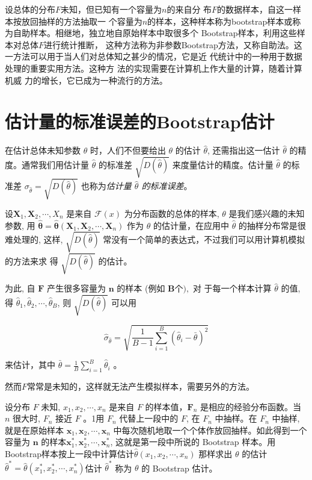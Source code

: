 设总体的分布$F$未知，但已知有一个容量为$n$的来自分
布$F$的数据样本，自这一样本按放回抽样的方法抽取一
个容量为$n$的样本，这种样本称为bootstrap样本或称
为自助样本。相继地，独立地自原始样本中取很多个
Bootstrap样本，利用这些样本对总体$F$进行统计推断，
这种方法称为非参数Bootstrap方法，又称自助法。这
一方法可以用于当人们对总体知之甚少的情况，它是近
代统计中的一种用于数据处理的重要实用方法。这种方
法的实现需要在计算机上作大量的计算，随着计算机威
力的增长，它已成为一种流行的方法。

\section{估计量的标准误差的Bootstrap估计}

在估计总体未知参数 $ \theta $ 时，人们不但要给出 $ \theta $ 的估计 $ \hat{\theta} $, 还需指出这一估计 $ \hat{\theta} $ 的精度。通常我们用估计量 $ \hat{\theta} $
的标准差 $ \sqrt{D(\hat{\theta})} $ 来度量估计的精度。估计量 $ \hat{\theta} $ 的标准差 $ \sigma_{\hat{\theta}}=\sqrt{D(\hat{\theta})} $ 也称为\textit{估计量 $ \hat{\theta} $ 的标准误差}。

设$ \boldsymbol{X}_{1}, \boldsymbol{X}_{2}, \cdots, X_{n} $ 是来自 $ \mathcal{F}(x) $ 为分布函数的总体的样本, $ \theta $ 是我们感兴趣的未知参数, 用 $ \hat{\boldsymbol{\theta}}=\hat{\boldsymbol{\theta}}\left(\boldsymbol{X}_{1}, \boldsymbol{X}_{2}, \cdots, \boldsymbol{X}_{n}\right) $ 作为 $ \theta $ 的估计量，在应用中 $ \hat{\theta} $ 的抽样分布常是很难处理的, 这样, $ \sqrt{D(\hat{\theta})} $ 常没有一个简单的表达式，不过我们可以用计算机模拟的方法来求 得 $ \sqrt{D(\hat{\theta})} $ 的估计。

为此, 自 $ \boldsymbol{F} $ 产生很多容量为 $ \boldsymbol{n} $ 的样本 (例如 $ \boldsymbol{B 个 ) ,} $ 对 于每一个样本计算 $ \hat{\theta} $ 的值, 得 $ \hat{\theta}_{1}, \hat{\theta}_{2}, \cdots, \hat{\theta}_{B} $, 则 $ \sqrt{D(\hat{\theta})} $ 可以用

$$ \hat{\sigma}_{\hat{\theta}}=\sqrt{\frac{1}{B-1} \sum_{i=1}^{B}\left(\hat{\theta}_{i}-\bar{\theta}\right)^{2}} $$

来估计，其中 $ \bar{\theta}=\frac{1}{B} \sum_{i=1}^{B} \hat{\theta}_{i} $ 。

然而$F$常常是未知的，这样就无法产生模拟样本，需要另外的方法。

设分布 $ F $ 未知, $ x_{1}, x_{2}, \cdots, x_{n} $ 是来自 $ F $ 的样本值，$ \boldsymbol{F}_{n} $ 是相应的经验分布函数。当 $ n $ 很大时, $ F_{n} $ 接近 $ F $ 。1用 $ F_{n} $ 代替上一段中的 $ F $, 在 $ F_{n} $ 中抽样。在 $ F_{n} $ 中抽样, 就是在原始样本 $ \boldsymbol{x}_{1}, \boldsymbol{x}_{2}, \cdots, \boldsymbol{x}_{n} $ 中每次随机地取一个个体作放回抽样。如此得到一个容量为 $ \boldsymbol{n} $ 的样本$ \boldsymbol{x}_{1}^{*}, \boldsymbol{x}_{2}^{*}, \cdots, \boldsymbol{x}_{n}^{*} $, 这就是第一段中所说的 Bootstrap 样本。用Bootstrap样本按上一段中计算估计$ \hat{\theta}\left(x_{1}, x_{2}, \cdots, x_{n}\right) $ 那样求出 $ \theta $ 的估计 $ \hat{\theta}^{*}=\hat{\theta}\left(x_{1}^{*}, x_{2}^{*}, \cdots, x_{n}^{*}\right) $估计 $ \hat{\theta}^{*} $ 称为 $ \theta $ 的 Bootstrap 估计。



